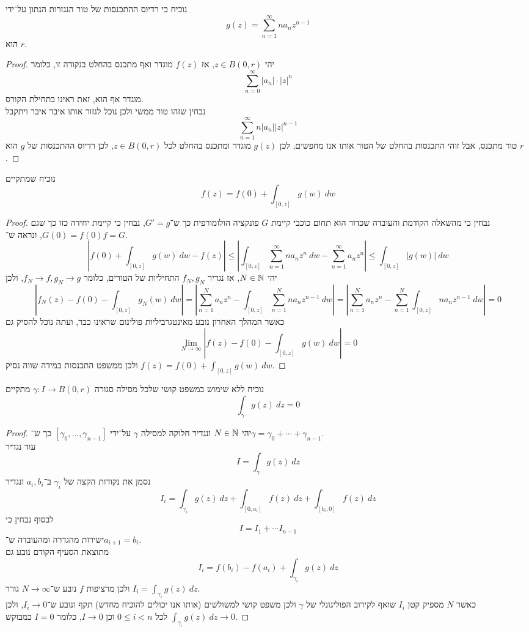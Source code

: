 \subquestion{}
נוכיח כי רדיוס ההתכנסות של טור הנגזרות הנתון על־ידי
\[
	g(z) = \sum_{n = 1}^{\infty} n a_n z^{n - 1}
\]
הוא $r$.
\begin{proof}
	יהי $z \in B(0, r)$, אז $f(z)$ מוגדר ואף מתכנס בהחלט בנקודה זו, כלומר
	\[
		\sum_{n = 0}^{\infty} |a_n| \cdot {|z|}^n
	\]
	מוגדר אף הוא, זאת ראינו בתחילת הקורס. \\
	נבחין שזהו טור ממשי ולכן נוכל לגזור אותו איבר איבר ויתקבל
	\[
		\sum_{n = 1}^{\infty} n |a_n| {|z|}^{n - 1}
	\]
	טור מתכנס, אבל זוהי התכנסות בהחלט של הטור אותו אנו מחפשים, לכן $g(z)$ מוגדר ומתכנס בהחלט לכל $z \in B(0, r)$, לכן רדיוס ההתכנסות של $g$ הוא $r$.
\end{proof}

\subquestion{}
נוכיח שמתקיים
\[
	f(z) = f(0) + \int_{[0, z]} g(w)\ dw
\]
\begin{proof}
	נבחין כי מהשאלה הקודמת והעובדה שכדור הוא תחום כוכבי קיימת $G$ פונקציה הולומורפית כך ש־$G' = g$, נבחין כי קיימת יחידה כזו כך שגם $G(0) = f(0)$, ונראה ש־$f = G$.
	\[
		\left\lvert f(0) + \int_{[0, z]} g(w)\ dw - f(z) \right\rvert
		\le \left\lvert \int_{[0, z]} \sum_{n = 1}^{\infty} n a_n z^n\ dw - \sum_{n = 1}^{\infty} a_n z^n \right\rvert
		\le \int_{[0, z]} |g(w)|\ dw
	\]
	יהי $N \in \mathbb{N}$, אז נגדיר $f_N, g_N$ התחיליות של הטורים, כלומר $f_N \to f, g_N \to g$, ולכן
	\[
		\left\lvert f_N(z) - f(0) - \int_{[0, z]} g_N(w)\ dw \right\rvert
		= \left\lvert \sum_{n = 1}^{N} a_n z^n - \int_{[0, z]} \sum_{n = 1}^{N} n a_n z^{n - 1}\ dw \right\rvert
		= \left\lvert \sum_{n = 1}^{N} a_n z^n - \sum_{n = 1}^{N} \int_{[0, z]} n a_n z^{n - 1}\ dw \right\rvert
		= 0
	\]
	כאשר המהלך האחרון נובע מאינטגרביליות פולינום שראינו כבר, ועתה נוכל להסיק גם
	\[
		\lim_{N \to \infty} |f(z) - f(0) - \int_{[0, z]} g(w)\ dw| = 0
	\]
	ולכן ממשפט התכנסות במידה שווה נסיק $f(z) = f(0) + \int_{[0, z]} g(w)\ dw$.
\end{proof}

\subquestion{}
נוכיח ללא שימוש במשפט קושי שלכל מסילה סגורה $\gamma : I \to B(0, r)$ מתקיים
\[
	\int_\gamma g(z)\ dz = 0
\]
\begin{proof}
	יהי $N \in \mathbb{N}$ ונגדיר חלוקה למסילה $\gamma$ על־ידי $[\gamma_0, \dots, \gamma_{n - 1}]$ כך ש־$\gamma = \gamma_0 + \cdots + \gamma_{n - 1}$. \\
	עוד נגדיר
	\[
		I = \int_\gamma g(z)\ dz
	\]
	נסמן את נקודות הקצה של $\gamma_i$ ב־$a_i, b_i$ ונגדיר
	\[
		I_i = \int_{\gamma_i} g(z)\ dz + \int_{[0, a_i]} f(z)\ dz + \int_{[b_i, 0]} f(z)\ dz
	\]
	לבסוף נבחין כי
	\[
		I = I_1 + \cdots I_{n - 1}
	\]
	ישירות מהגדרה ומהעובדה ש־$a_{i + 1} = b_i$. \\
	מתוצאת הסעיף הקודם נובע גם
	\[
		I_i = f(b_i) - f(a_i) + \int_{\gamma_i} g(z)\ dz
	\]
	ולכן מרציפות $f$ נובע ש־$N \to \infty$ גורר $I_i = \int_{\gamma_i} g(z)\ dz$. \\
	כאשר $N$ מספיק קטן $I_i$ שואף לקירוב הפוליגונלי של $\gamma$ ולכן משפט קושי למשולשים (אותו אנו יכולים להוכיח מחדש) תקף ונובע ש־$I_i \to 0$,
	ולכן $\int_{\gamma_i} g(z)\ dz \to 0$ לכל $0 \le i < n$ וכן $I \to 0$, כלומר $I = 0$ כמבוקש.
\end{proof}


